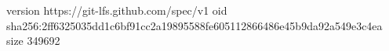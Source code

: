 version https://git-lfs.github.com/spec/v1
oid sha256:2ff6325035dd1c6bf91cc2a19895588fe605112866486e45b9da92a549e3c4ea
size 349692

